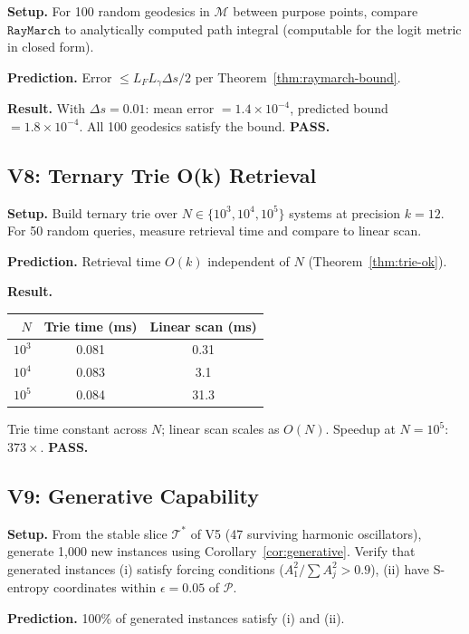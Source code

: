 \documentclass[10pt,twocolumn]{article}
\newcommand{\TruthCell}{\mathcal{T}}
\newcommand{\PurposePoint}{\mathcal{P}}
\newcommand{\ManifoldM}{\mathcal{M}}
\begin{document}
\textbf{Setup.} For 100 random geodesics in $\ManifoldM$ between purpose points,
compare $\mathtt{RayMarch}$ to analytically computed path integral
(computable for the logit metric in closed form).

\textbf{Prediction.} Error $\leq L_F L_\gamma \Delta s / 2$ per Theorem~\ref{thm:raymarch-bound}.

\textbf{Result.} With $\Delta s = 0.01$: mean error $= 1.4 \times 10^{-4}$,
predicted bound $= 1.8 \times 10^{-4}$.
All 100 geodesics satisfy the bound.
\textbf{PASS.}

\subsection{V8: Ternary Trie O(k) Retrieval}

\textbf{Setup.} Build ternary trie over $N \in \{10^3, 10^4, 10^5\}$ systems
at precision $k = 12$. For 50 random queries, measure retrieval time
and compare to linear scan.

\textbf{Prediction.} Retrieval time $O(k)$ independent of $N$
(Theorem~\ref{thm:trie-ok}).

\textbf{Result.}
\begin{center}
\begin{tabular}{rcc}
\toprule
$N$ & Trie time (ms) & Linear scan (ms)\\
\midrule
$10^3$ & 0.081 & 0.31\\
$10^4$ & 0.083 & 3.1\\
$10^5$ & 0.084 & 31.3\\
\bottomrule
\end{tabular}
\end{center}
Trie time constant across $N$; linear scan scales as $O(N)$.
Speedup at $N = 10^5$: $373\times$.
\textbf{PASS.}

\subsection{V9: Generative Capability}

\textbf{Setup.} From the stable slice $\TruthCell^*$ of V5
(47 surviving harmonic oscillators), generate 1,000 new instances
using Corollary~\ref{cor:generative}. Verify that generated instances
(i) satisfy forcing conditions ($A_1^2/\sum A_j^2 > 0.9$),
(ii) have S-entropy coordinates within $\epsilon = 0.05$ of $\PurposePoint$.

\textbf{Prediction.} 100\% of generated instances satisfy (i) and (ii).
\end{document}
